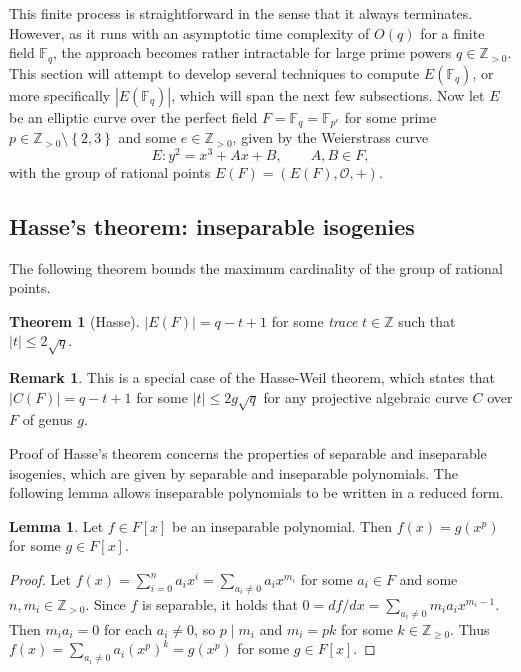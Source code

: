 \documentclass{article}
\newcommand{\F}{\mathbb{F}}
\newcommand{\Z}{\mathbb{Z}}
\newcommand{\rb}[1]{\left( #1 \right)}
\renewcommand{\sb}[1]{\left[ #1 \right]}
\newcommand{\cb}[1]{\left\{ #1 \right\}}
\newcommand{\abs}[1]{\left\lvert #1 \right\rvert}
\theoremstyle{definition}
\newtheorem*{remark}{Remark}
\newtheorem{lemma}[proposition]{Lemma}
\newtheorem{theorem}[proposition]{Theorem}
\begin{document}
This finite process is straightforward in the sense that it always terminates. However, as it runs with an asymptotic time complexity of $ O\rb{q} $ for a finite field $ \F_q $, the approach becomes rather intractable for large prime powers $ q \in \Z_{> 0} $. This section will attempt to develop several techniques to compute $ E\rb{\F_q} $, or more specifically $ \abs{E\rb{\F_q}} $, which will span the next few subsections. Now let $ E $ be an elliptic curve over the perfect field $ F = \F_q = \F_{p^e} $ for some prime $ p \in \Z_{> 0} \setminus \cb{2, 3} $ and some $ e \in \Z_{> 0} $, given by the Weierstrass curve
$$ E : y^2 = x^3 + Ax + B, \qquad A, B \in F, $$
with the group of rational points $ E\rb{F} = \rb{E\rb{F}, \mathcal{O}, +} $.

\subsection{Hasse's theorem: inseparable isogenies}

The following theorem bounds the maximum cardinality of the group of rational points.

\begin{theorem}[Hasse]
\label{thm:hasse}
$ \abs{E\rb{F}} = q - t + 1 $ for some \emph{trace} $ t \in \Z $ such that $ \abs{t} \le 2\sqrt{q} $.
\end{theorem}

\begin{remark}
This is a special case of the Hasse-Weil theorem, which states that $ \abs{C\rb{F}} = q - t + 1 $ for some $ \abs{t} \le 2g\sqrt{q} $ for any projective algebraic curve $ C $ over $ F $ of genus $ g $.
\end{remark}

Proof of Hasse's theorem concerns the properties of separable and inseparable isogenies, which are given by separable and inseparable polynomials. The following lemma allows inseparable polynomials to be written in a reduced form.

\begin{lemma}
Let $ f \in F\sb{x} $ be an inseparable polynomial. Then $ f\rb{x} = g\rb{x^p} $ for some $ g \in F\sb{x} $.
\end{lemma}

\begin{proof}
Let $ f\rb{x} = \sum_{i = 0}^n a_ix^i = \sum_{a_i \ne 0} a_ix^{m_i} $ for some $ a_i \in F $ and some $ n, m_i \in \Z_{> 0} $. Since $ f $ is separable, it holds that $ 0 = df / dx = \sum_{a_i \ne 0} m_ia_ix^{m_i - 1} $. Then $ m_ia_i = 0 $ for each $ a_i \ne 0 $, so $ p \mid m_i $ and $ m_i = pk $ for some $ k \in \Z_{\ge 0} $. Thus $ f\rb{x} = \sum_{a_i \ne 0} a_i\rb{x^p}^k = g\rb{x^p} $ for some $ g \in F\sb{x} $.
\end{proof}
\end{document}
